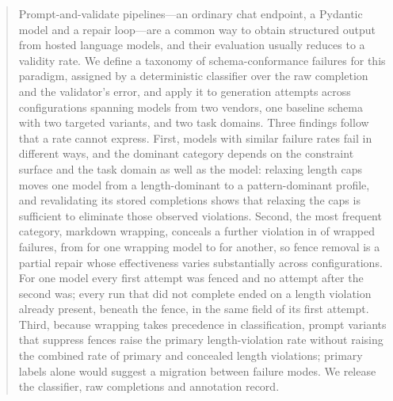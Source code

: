 \begin{abstract}
Prompt-and-validate pipelines---an ordinary chat endpoint, a Pydantic
model and a repair loop---are a common way to obtain structured output
from hosted language models, and their evaluation usually reduces to a
validity rate. We define a taxonomy of schema-conformance failures for
this paradigm, assigned by a deterministic classifier over the raw
completion and the validator's error, and apply it to
 generation attempts across 
configurations spanning  models from two vendors,
one baseline schema with two targeted variants, and two task domains.
Three findings follow that a rate cannot express. First, models with
similar failure rates fail in different ways, and the dominant category
depends on the constraint surface and the task domain as well as the
model: relaxing length caps moves one model from a length-dominant to a
pattern-dominant profile, and revalidating its stored completions shows
that relaxing the caps is sufficient to eliminate those observed
violations. Second, the most frequent category, markdown wrapping,
conceals a further violation in 
of wrapped failures, from 
for one wrapping model to 
for another, so fence removal is a partial repair whose effectiveness
varies substantially across configurations. For one model every first
attempt was fenced and no attempt after the second was; every run that did not complete ended on a length violation already present, beneath the fence, in the same field of its first attempt.
Third, because wrapping takes precedence in classification, prompt
variants that suppress fences raise the primary length-violation rate
without raising the combined rate of primary and concealed length
violations; primary labels alone would suggest a migration between
failure modes. We release the classifier, raw completions and annotation
record.
\end{abstract}
